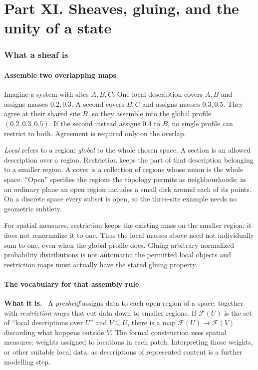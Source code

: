 \documentclass[11pt]{article}
\newcommand{\what}{\par\smallskip\noindent\textbf{What it is.}\ }
\begin{document}
\part*{Part XI. Sheaves, gluing, and the unity of a state}
\section{What a sheaf is}
\label{sec:sheaf}

\subsection{Assemble two overlapping maps}

Imagine a system with sites $A,B,C$. One local description covers $A,B$ and
assigns masses $0.2,0.3$. A second covers $B,C$ and assigns masses $0.3,0.5$.
They agree at their shared site $B$, so they assemble into the global profile
$(0.2,0.3,0.5)$. If the second instead assigns $0.4$ to $B$, no single profile
can restrict to both. Agreement is required only on the overlap.

\emph{Local} refers to a region; \emph{global} to the whole chosen space.
A section is an allowed description over a region. Restriction keeps the part
of that description belonging to a smaller region. A cover is a collection
of regions whose union is the whole space. ``Open'' specifies the regions the
topology permits as neighbourhoods; in an ordinary plane an open region
includes a small disk around each of its points. On a discrete space every
subset is open, so the three-site example needs no geometric subtlety.

For spatial measures, restriction keeps the existing mass on the smaller
region; it does not renormalize it to one. Thus the local masses above need
not individually sum to one, even when the global profile does. Gluing arbitrary
normalized probability distributions is not automatic: the permitted local
objects and restriction maps must actually have the stated gluing property.

\subsection{The vocabulary for that assembly rule}

\what
A \emph{presheaf} assigns data to each open region of a space, together with
\emph{restriction maps} that cut data down to smaller regions. If
$\mathcal{F}(U)$ is the set of ``local descriptions over $U$'' and
$V\subseteq U$, there is a map $\mathcal{F}(U)\to\mathcal{F}(V)$ discarding
what happens outside $V$. The formal construction uses spatial measures:
weights assigned to locations in each patch. Interpreting those weights, or
other suitable local data, as descriptions of represented content is a further
modelling step.
\end{document}
